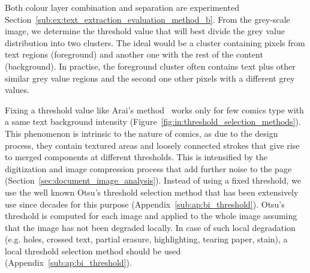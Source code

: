 Both colour layer combination and separation are experimented Section~\ref{sub:ex:text_extraction_evaluation_method_b}.
From the grey-scale image, we determine the threshold value that will best divide the grey value distribution into two clusters.
The ideal would be a cluster containing pixels from text regions (foreground) and another one with the rest of the content (background).
In practise, the foreground cluster often contains text plus other similar grey value regions and the second one other pixels with a different grey values.



Fixing a threshold value like Arai's method~\cite{Arai11} works only for few comics type with a same text background intensity (Figure~\ref{fig:in:threshold_selection_methods}).
This phenomenon is intrinsic to the nature of comics, as due to the design process, they contain textured areas and loosely connected strokes that give rise to merged components at different thresholds.
This is intensified by the digitization and image compression process that add further noise to the page (Section~\ref{sec:document_image_analysis}).
Instead of using a fixed threshold, we use the well known Otsu's threshold selection method that has been extensively use since decades for this purpose (Appendix~\ref{sub:ap:bi_threshold}).
Otsu's threshold is computed for each image and applied to the whole image assuming that the image has not been degraded locally.
In case of such local degradation (e.g. holes, crossed text, partial erasure, highlighting, tearing paper, stain), a local threshold selection method should be used (Appendix~\ref{sub:ap:bi_threshold}).


